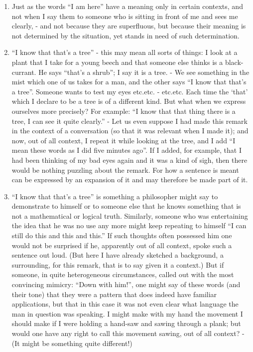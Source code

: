 \documentclass{book}
\begin{document}
\begin{enumerate}
\item
Just as the words ``I am here'' have a meaning only in certain contexts, and
not when I say them to someone who is sitting in front of me and sees me
clearly, - and not because they are superfluous, but because their meaning is
not determined by the situation, yet stands in need of such determination.

\item
``I know that that's a tree'' - this may mean all sorts of things: I look at a
plant that I take for a young beech and that someone else thinks is a
black-currant. He says ``that's a shrub''; I say it is a tree. - We see
something in the mist which one of us takes for a man, and the other says ``I
know that that's a tree''. Someone wants to test my eyes etc.etc. - etc.etc.
Each time the `that' which I declare to be a tree is of a different kind.  But
what when we express ourselves more precisely? For example: ``I know that that
thing there is a tree, I can see it quite clearly.'' - Let us even suppose I
had made this remark in the context of a conversation (so that it was relevant
when I made it); and now, out of all context, I repeat it while looking at the
tree, and I add ``I mean these words as I did five minutes ago''. If I added,
for example, that I had been thinking of my bad eyes again and it was a kind of
sigh, then there would be nothing puzzling about the remark.  For how a
sentence is meant can be expressed by an expansion of it and may therefore be
made part of it.

\item
``I know that that's a tree'' is something a philosopher might say to
demonstrate to himself or to someone else that he knows something that is not a
mathematical or logical truth. Similarly, someone who was entertaining the idea
that he was no use any more might keep repeating to himself ``I can still do
this and this and this.'' If such thoughts often possessed him one would not be
surprised if he, apparently out of all context, spoke such a sentence out loud.
(But here I have already sketched a background, a surrounding, for this remark,
that is to say given it a context.) But if someone, in quite heterogeneous
circumstances, called out with the most convincing mimicry: ``Down with him!'',
one might say of these words (and their tone) that they were a pattern that
does indeed have familiar applications, but that in this case it was not even
clear what language the man in question was speaking. I might make with my hand
the movement I should make if I were holding a hand-saw and sawing through a
plank; but would one have any right to call this movement sawing, out of all
context? - (It might be something quite different!)


\end{enumerate}
\end{document}
